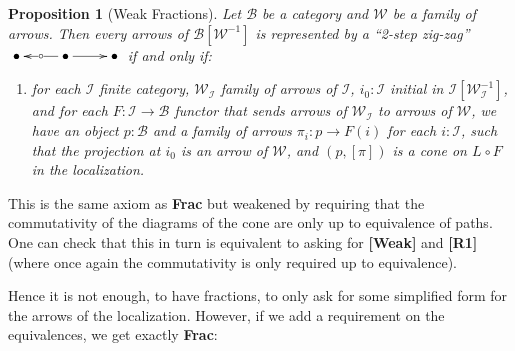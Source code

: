 \documentclass{article}
\numberwithin{equation}{section}
\theoremstyle{definition}
\theoremstyle{plain}
\newtheorem{proposition}[equation]{Proposition}
\begin{document}
\begin{proposition}[Weak Fractions] Let $\mathcal{B}$ be a category and $\mathcal{W}$ be a family of arrows. Then every arrows of $\mathcal{B}[\mathcal{W}^{-1}]$ is represented by a ``2-step zig-zag'' $\xymatrix{\bullet & \bullet \ar[l]|{\circ} \ar[r] & \bullet}$ if and only if:
	\begin{enumerate}
		\item[\textbf{[Frac]:}] for each $\mathcal{I}$ finite category, $\mathcal{W}_{\mathcal{I}}$ family of arrows of $\mathcal{I}$, $i_0:\mathcal{I}$ initial in $\mathcal{I}[\mathcal{W}_{\mathcal{I}}^{-1}]$, and for each $F:\mathcal{I} \to \mathcal{B}$ functor that sends arrows of $\mathcal{W}_{\mathcal{I}}$ to arrows of $\mathcal{W}$, we have an object $p:\mathcal{B}$ and a family of arrows $\pi_i:p \to F(i)$ for each $i:\mathcal{I}$, such that the projection at $i_0$ is an arrow of $\mathcal{W}$, and $(p,[\pi])$ is a cone on $L_{\mathcal{}}\circ F$ in the localization.
	\end{enumerate}
\end{proposition}
This is the same axiom as \textbf{Frac} but weakened by requiring that the commutativity of the diagrams of the cone are only up to equivalence of paths. One can check that this in turn is equivalent to asking for \textbf{[Weak]} and \textbf{[R1]} (where once again the commutativity is only required up to equivalence).

Hence it is not enough, to have fractions, to only ask for some simplified form for the arrows of the localization. However, if we add a requirement on the equivalences, we get exactly \textbf{Frac}:
\end{document}
